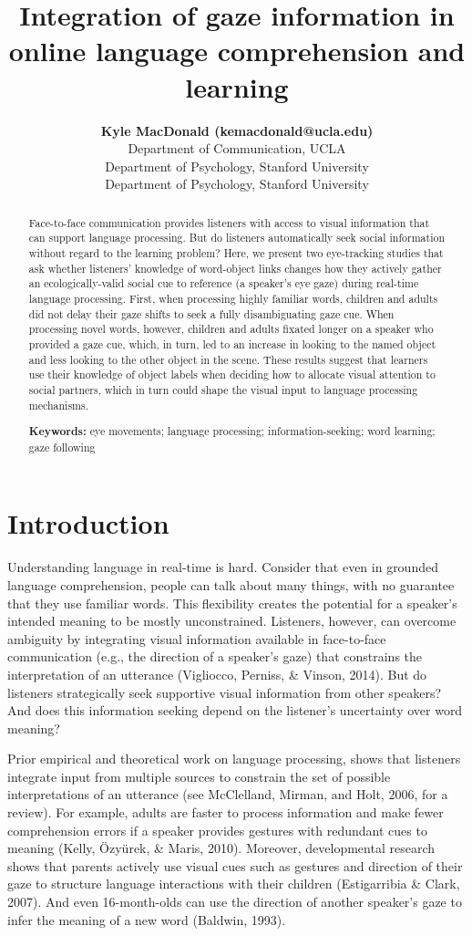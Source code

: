 \documentclass[10pt, letterpaper]{article}
\title{Integration of gaze information in online language comprehension and
learning}
\author{{\large \bf Kyle MacDonald (kemacdonald@ucla.edu)} \\ Department of Communication, UCLA  \AND {\large \bf Elizabeth Swanson (elizswan@stanford.edu)} \\ Department of Psychology, Stanford University  \AND {\large \bf Michael C. Frank (mcfrank@stanford.edu)} \\ Department of Psychology, Stanford University  }
\begin{document}
\maketitle

\begin{abstract}
Face-to-face communication provides listeners with access to visual
information that can support language processing. But do listeners
automatically seek social information without regard to the learning
problem? Here, we present two eye-tracking studies that ask whether
listeners' knowledge of word-object links changes how they actively
gather an ecologically-valid social cue to reference (a speaker's eye
gaze) during real-time language processing. First, when processing
highly familiar words, children and adults did not delay their gaze
shifts to seek a fully disambiguating gaze cue. When processing novel
words, however, children and adults fixated longer on a speaker who
provided a gaze cue, which, in turn, led to an increase in looking to
the named object and less looking to the other object in the scene.
These results suggest that learners use their knowledge of object labels
when deciding how to allocate visual attention to social partners, which
in turn could shape the visual input to language processing mechanisms.

\textbf{Keywords:}
eye movements; language processing; information-seeking; word learning;
gaze following
\end{abstract}

\hypertarget{introduction}{%
\section{Introduction}\label{introduction}}

Understanding language in real-time is hard. Consider that even in
grounded language comprehension, people can talk about many things, with
no guarantee that they use familiar words. This flexibility creates the
potential for a speaker's intended meaning to be mostly unconstrained.
Listeners, however, can overcome ambiguity by integrating visual
information available in face-to-face communication (e.g., the direction
of a speaker's gaze) that constrains the interpretation of an utterance
(Vigliocco, Perniss, \& Vinson, 2014). But do listeners strategically
seek supportive visual information from other speakers? And does this
information seeking depend on the listener's uncertainty over word
meaning?

Prior empirical and theoretical work on language processing, shows that
listeners integrate input from multiple sources to constrain the set of
possible interpretations of an utterance (see McClelland, Mirman, and
Holt, 2006, for a review). For example, adults are faster to process
information and make fewer comprehension errors if a speaker provides
gestures with redundant cues to meaning (Kelly, Özyürek, \& Maris,
2010). Moreover, developmental research shows that parents actively use
visual cues such as gestures and direction of their gaze to structure
language interactions with their children (Estigarribia \& Clark, 2007).
And even 16-month-olds can use the direction of another speaker's gaze
to infer the meaning of a new word (Baldwin, 1993).
\end{document}
